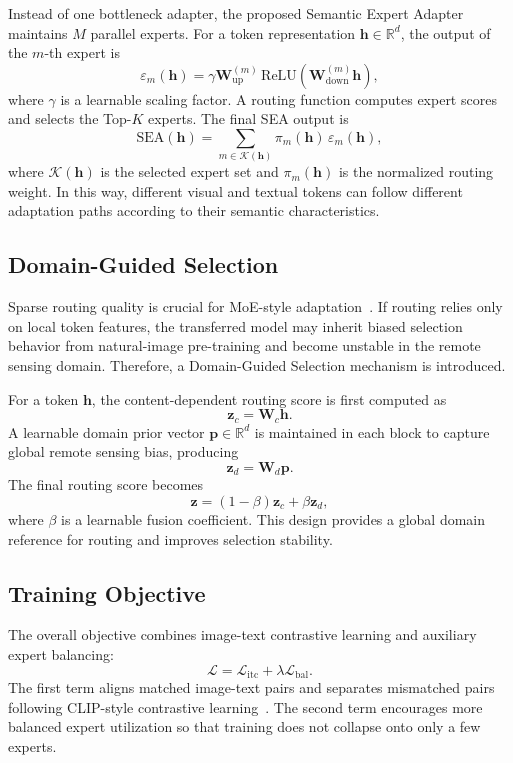 \documentclass[conference]{IEEEtran}
\begin{document}
Instead of one bottleneck adapter, the proposed Semantic Expert Adapter maintains $M$ parallel experts. For a token representation $\mathbf{h}\in\mathbb{R}^{d}$, the output of the $m$-th expert is
\begin{equation}
\varepsilon_m(\mathbf{h}) = \gamma \mathbf{W}^{(m)}_{\mathrm{up}}\,\mathrm{ReLU}(\mathbf{W}^{(m)}_{\mathrm{down}}\mathbf{h}),
\end{equation}
where $\gamma$ is a learnable scaling factor. A routing function computes expert scores and selects the Top-$K$ experts. The final SEA output is
\begin{equation}
\mathrm{SEA}(\mathbf{h})=\sum_{m\in\mathcal{K}(\mathbf{h})}\pi_m(\mathbf{h})\,\varepsilon_m(\mathbf{h}),
\end{equation}
where $\mathcal{K}(\mathbf{h})$ is the selected expert set and $\pi_m(\mathbf{h})$ is the normalized routing weight. In this way, different visual and textual tokens can follow different adaptation paths according to their semantic characteristics.

\subsection{Domain-Guided Selection}
Sparse routing quality is crucial for MoE-style adaptation~\cite{ref8,ref9}. If routing relies only on local token features, the transferred model may inherit biased selection behavior from natural-image pre-training and become unstable in the remote sensing domain. Therefore, a Domain-Guided Selection mechanism is introduced.

For a token $\mathbf{h}$, the content-dependent routing score is first computed as
\begin{equation}
\mathbf{z}_c = \mathbf{W}_c\mathbf{h}.
\end{equation}
A learnable domain prior vector $\mathbf{p}\in\mathbb{R}^{d}$ is maintained in each block to capture global remote sensing bias, producing
\begin{equation}
\mathbf{z}_d = \mathbf{W}_d\mathbf{p}.
\end{equation}
The final routing score becomes
\begin{equation}
\mathbf{z}=(1-\beta)\mathbf{z}_c+\beta\mathbf{z}_d,
\end{equation}
where $\beta$ is a learnable fusion coefficient. This design provides a global domain reference for routing and improves selection stability.

\subsection{Training Objective}
The overall objective combines image-text contrastive learning and auxiliary expert balancing:
\begin{equation}
\mathcal{L}=\mathcal{L}_{\mathrm{itc}}+\lambda\mathcal{L}_{\mathrm{bal}}.
\end{equation}
The first term aligns matched image-text pairs and separates mismatched pairs following CLIP-style contrastive learning~\cite{ref3}. The second term encourages more balanced expert utilization so that training does not collapse onto only a few experts.
\end{document}
